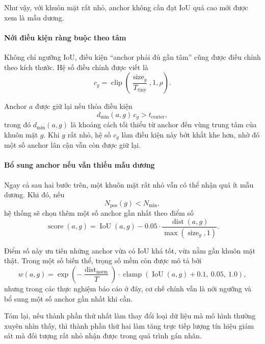 Như vậy, với khuôn mặt rất nhỏ, anchor không cần đạt IoU quá cao mới được xem là mẫu dương.

\paragraph{Nới điều kiện ràng buộc theo tâm}
Không chỉ ngưỡng IoU, điều kiện ``anchor phải đủ gần tâm'' cũng được điều chỉnh theo kích thước.
Hệ số điều chỉnh được viết là
\begin{equation}
c_g =
\operatorname{clip}\!\left(
  \frac{\operatorname{size}_g}{T_{\text{tiny}}},
  1,\rho
\right).
\end{equation}

Anchor \(a\) được giữ lại nếu thỏa điều kiện
\begin{equation}
d_{\min}(a,g)\, c_g > t_{\text{center}},
\end{equation}
trong đó \(d_{\min}(a,g)\) là khoảng cách tối thiểu từ anchor đến vùng trung tâm của khuôn mặt \(g\).
Khi \(g\) rất nhỏ, hệ số \(c_g\) làm điều kiện này bớt khắt khe hơn, nhờ đó một số anchor lân cận vẫn còn được giữ lại.

\paragraph{Bổ sung anchor nếu vẫn thiếu mẫu dương}
Ngay cả sau hai bước trên, một khuôn mặt rất nhỏ vẫn có thể nhận quá ít mẫu dương.
Khi đó, nếu
\begin{equation}
N_{\text{pos}}(g) < N_{\text{min}},
\end{equation}
hệ thống sẽ chọn thêm một số anchor gần nhất theo điểm số
\begin{equation}
\operatorname{score}(a,g)
=
\operatorname{IoU}(a,g)
- 0.05 \cdot
\frac{\operatorname{dist}(a,g)}{\max(\operatorname{size}_g,1)}.
\end{equation}

Điểm số này ưu tiên những anchor vừa có IoU khá tốt, vừa nằm gần khuôn mặt thật.
Trong một số biến thể, trọng số mềm còn được mô tả bởi
\begin{equation}
w(a,g) =
\exp\!\left(-\frac{\operatorname{dist}_{\text{norm}}}{T}\right)
\cdot
\operatorname{clamp}\!\left(\operatorname{IoU}(a,g)+0.1,\ 0.05,\ 1.0\right),
\end{equation}
nhưng trong các thực nghiệm báo cáo ở đây, cơ chế chính vẫn là nới ngưỡng và bổ sung một số anchor gần nhất khi cần.

Tóm lại, nếu thành phần thứ nhất làm thay đổi loại dữ liệu mà mô hình thường xuyên nhìn thấy, thì thành phần thứ hai làm tăng trực tiếp lượng tín hiệu giám sát mà đối tượng rất nhỏ nhận được trong quá trình gán nhãn.

